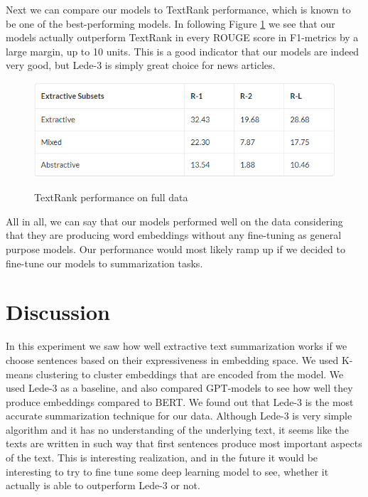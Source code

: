 \documentclass{article}
\begin{document}
\noindent
Next we can compare our models to TextRank performance, which is known to be one of the best-performing models. In following Figure \ref{fig:textrank} we see that our models actually outperform TextRank in every ROUGE score in F1-metrics by a large margin, up to 10 units. This is a good indicator that our models are indeed very good, but Lede-3 is simply great choice for news articles.

\begin{figure}[H]
	\centering
	\hspace*{-2cm}
	\includegraphics[scale=0.55]{textrank_full.png}\\
	\caption{TextRank performance on full data}
	\label{fig:textrank}
\end{figure}

\noindent
All in all, we can say that our models performed well on the data considering that they are producing word embeddings without any fine-tuning as general purpose models. Our performance would most likely ramp up if we decided to fine-tune our models to summarization tasks. \\

\section{Discussion}

\noindent
In this experiment we saw how well extractive text summarization works if we choose sentences based on their expressiveness in embedding space. We used K-means clustering to cluster embeddings that are encoded from the model. We used Lede-3 as a baseline, and also compared GPT-models to see how well they produce embeddings compared to BERT. We found out that Lede-3 is the most accurate summarization technique for our data. Although Lede-3 is very simple algorithm and it has no understanding of the underlying text, it seems like the texts are written in such way that first sentences produce most important aspects of the text. This is interesting realization, and in the future it would be interesting to try to fine tune some deep learning model to see, whether it actually is able to outperform Lede-3 or not.\\
\end{document}
